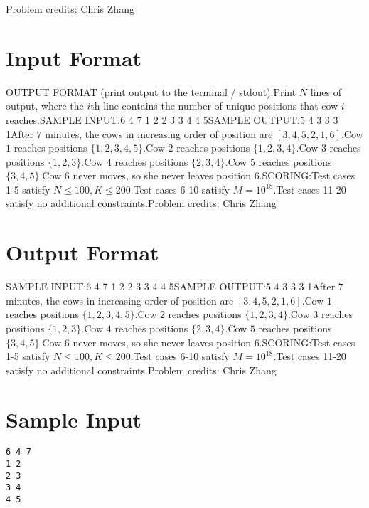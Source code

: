 \documentclass[12pt]{article}
\begin{document}
Problem credits: Chris Zhang



\section*{Input Format}
OUTPUT FORMAT (print output to the terminal / stdout):Print $N$ lines of output, where the $i$th line contains the number of unique
positions that cow $i$ reaches.SAMPLE INPUT:6 4 7
1 2
2 3
3 4
4 5SAMPLE OUTPUT:5
4
3
3
3
1After $7$ minutes, the cows in increasing order of position are $[3,4,5,2,1,6]$.Cow $1$ reaches positions $\{1,2,3,4,5\}$.Cow $2$ reaches positions $\{1,2,3,4\}$.Cow $3$ reaches positions $\{1,2,3\}$.Cow $4$ reaches positions $\{2,3,4\}$.Cow $5$ reaches positions $\{3,4,5\}$.Cow $6$ never moves, so she never leaves position $6$.SCORING:Test cases 1-5 satisfy $N\le 100, K\le 200$.Test cases 6-10 satisfy $M=10^{18}$.Test cases 11-20 satisfy no additional constraints.Problem credits: Chris Zhang

\section*{Output Format}
SAMPLE INPUT:6 4 7
1 2
2 3
3 4
4 5SAMPLE OUTPUT:5
4
3
3
3
1After $7$ minutes, the cows in increasing order of position are $[3,4,5,2,1,6]$.Cow $1$ reaches positions $\{1,2,3,4,5\}$.Cow $2$ reaches positions $\{1,2,3,4\}$.Cow $3$ reaches positions $\{1,2,3\}$.Cow $4$ reaches positions $\{2,3,4\}$.Cow $5$ reaches positions $\{3,4,5\}$.Cow $6$ never moves, so she never leaves position $6$.SCORING:Test cases 1-5 satisfy $N\le 100, K\le 200$.Test cases 6-10 satisfy $M=10^{18}$.Test cases 11-20 satisfy no additional constraints.Problem credits: Chris Zhang

\section*{Sample Input}
\begin{verbatim}
6 4 7
1 2
2 3
3 4
4 5
\end{verbatim}
\end{document}
